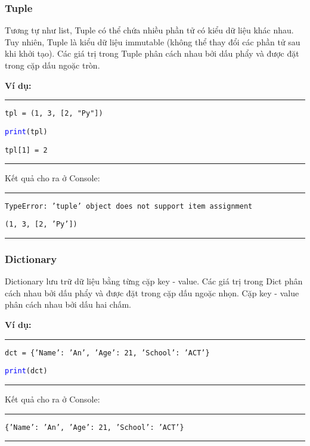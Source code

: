 \subsubsection{Tuple}
Tương tự như list, Tuple có thể chứa nhiều phần tử có kiểu dữ liệu khác nhau. Tuy nhiên, Tuple là kiểu dữ liệu immutable (không thể thay đổi các phần tử sau khi khởi tạo). Các giá trị trong Tuple phân cách nhau bởi dấu phẩy và được đặt trong cặp dấu ngoặc tròn.\par
\textbf{Ví dụ:}\\
\rule{\linewidth}{0.2mm}\par
\begin{linenumbers}
	\texttt{tpl = (1, 3, [2, "Py"])}\par
	\texttt{\textcolor{blue}{print}(tpl)}\par
	\texttt{tpl[1] = 2}\par
\end{linenumbers}
\rule{\linewidth}{0.2mm}\par
\noindent
\resetlinenumber
Kết quả cho ra ở Console:\\
\rule{\linewidth}{0.2mm}\par
\begin{linenumbers}
	\texttt{TypeError: 'tuple' object does not support item assignment}\par
	\texttt{(1, 3, [2, 'Py'])}\par
\end{linenumbers}
\rule{\linewidth}{0.2mm}\par
\resetlinenumber
\newpage
\subsubsection{Dictionary}
Dictionary lưu trữ dữ liệu bằng từng cặp key - value. Các giá trị trong Dict phân cách nhau bởi dấu phẩy và được đặt trong cặp dấu ngoặc nhọn. Cặp key - value phân cách nhau bởi dấu hai chấm.\par
\textbf{Ví dụ:}\\
\rule{\linewidth}{0.2mm}\par
\begin{linenumbers}
	\texttt{dct = \{'Name': 'An', 'Age': 21, 'School': 'ACT'\}}\par
	\texttt{\textcolor{blue}{print}(dct)}\par
\end{linenumbers}
\rule{\linewidth}{0.2mm}\par
\noindent
\resetlinenumber
Kết quả cho ra ở Console:\\
\rule{\linewidth}{0.2mm}\par
\begin{linenumbers}
	\texttt{\{'Name': 'An', 'Age': 21, 'School': 'ACT'\}}\par
\end{linenumbers}
\rule{\linewidth}{0.2mm}\par
\resetlinenumber
